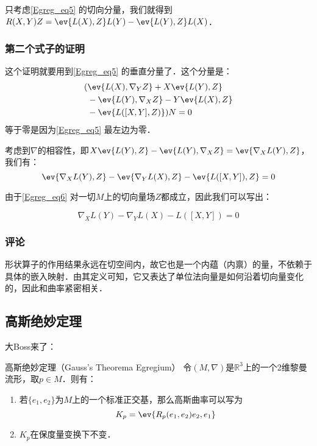 只考虑\autoref{Egreg_eq5} 的切向分量，我们就得到$R(X, Y)Z=\ev{L(X), Z}L(Y)-\ev{L(Y), Z}L(X)$．








\subsubsection{第二个式子的证明}

这个证明就要用到\autoref{Egreg_eq5} 的垂直分量了．这个分量是：
\begin{equation}
\begin{aligned}
(&\ev{L(X), \nabla_YZ}+X\ev{L(Y), Z}\\&-\ev{L(Y), \nabla_XZ}-Y\ev{L(X), Z}\\&-\ev{L([X, Y], Z)})N=0
\end{aligned}
\end{equation}
等于零是因为\autoref{Egreg_eq5} 最左边为零．

考虑到$\nabla$的相容性，即$X\ev{L(Y), Z}-\ev{L(Y), \nabla_XZ}=\ev{\nabla_XL(Y), Z}$，我们有：
\begin{equation}\label{Egreg_eq6}
\ev{\nabla_XL(Y), Z}-\ev{\nabla_YL(X), Z}-\ev{L([X, Y]), Z}=0
\end{equation}

由于\autoref{Egreg_eq6} 对一切$M$上的切向量场$Z$都成立，因此我们可以写出：

\begin{equation}
\nabla_XL(Y)-\nabla_YL(X)-L([X, Y])=0
\end{equation}

\subsubsection{评论}

形状算子的作用结果永远在切空间内，故它也是一个内蕴（内禀）的量，不依赖于具体的嵌入映射．由其定义可知，它又表达了单位法向量是如何沿着切向量变化的，因此和曲率紧密相关．





\subsection{高斯绝妙定理}

大Boss来了：

\begin{theorem}{高斯绝妙定理（Gauss's Theorema Egregium）}
令$(M, \nabla)$是$\mathbb{R}^3$上的一个2维黎曼流形，取$p\in M$．则有：
\begin{enumerate}
\item 若$\{e_1, e_2\}$为$M$上的一个标准正交基，那么高斯曲率可以写为
\begin{equation}
K_p=\ev{R_p(e_1, e_2)e_2, e_1}
\end{equation}
\item $K_p$在保度量变换下不变．
\end{enumerate}

\end{theorem}













